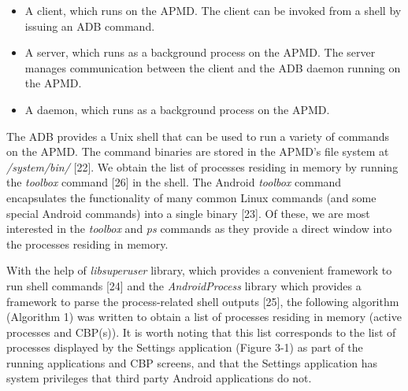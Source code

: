 \documentclass[12pt]{uthesis-v12}  %
\begin{document}
			\begin{itemize}
				\item A client, which runs on the APMD. The client can be invoked from a shell by issuing an ADB command.
				\item A server, which runs as a background process on the APMD. The server manages communication between the client and the ADB daemon running on the APMD.
				\item A daemon, which runs as a background process on the APMD.
			\end{itemize}
			
			The ADB provides a Unix shell that can be used to run a variety of commands on the APMD. The command binaries are stored in the APMD's file system at {\em /system/bin/} [22]. We obtain the list of processes residing in memory by running the {\em toolbox} command [26] in the shell. The Android {\em toolbox} command encapsulates the functionality of many common Linux commands (and some special Android commands) into a single binary [23]. Of these, we are most interested in the {\em toolbox} and {\em ps} commands as they provide a direct window into the processes residing in memory. 
			
%			
%			
			With the help of {\em libsuperuser} library, which provides a convenient framework to run shell commands [24] and the {\em AndroidProcess} library which provides a framework to parse the process-related shell outputs [25], the following algorithm (Algorithm 1) was written to obtain a list of processes residing in memory (active processes and CBP(s)). It is worth noting that this list corresponds to the list of processes displayed by the Settings application (Figure 3-1) as part of the running applications and CBP screens, and that the Settings application has system privileges that third party Android applications do not.\\ 
			
\end{document}
